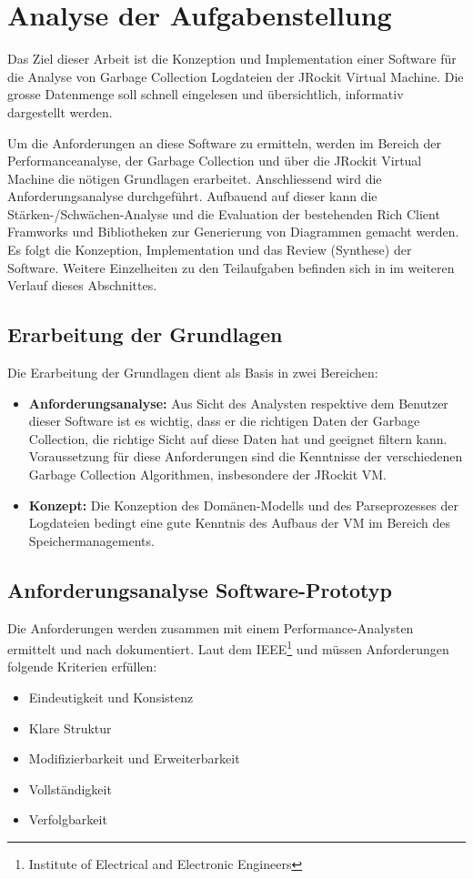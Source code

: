 \chapter{Analyse der Aufgabenstellung}\label{analyse_aufgabenstellung}
Das Ziel dieser Arbeit ist die Konzeption und Implementation einer Software für die Analyse von Garbage Collection Logdateien der JRockit Virtual Machine. Die grosse Datenmenge soll schnell eingelesen und übersichtlich, informativ dargestellt werden. 

Um die Anforderungen an diese Software zu ermitteln, werden im Bereich der Performanceanalyse, der Garbage Collection und über die JRockit Virtual Machine die nötigen Grundlagen erarbeitet. Anschliessend wird die Anforderungsanalyse durchgeführt. Aufbauend auf dieser kann die Stärken-/Schwächen-Analyse und die Evaluation der bestehenden Rich Client Framworks und Bibliotheken zur Generierung von Diagrammen gemacht werden. Es folgt die Konzeption, Implementation und das Review (Synthese) der Software. Weitere Einzelheiten zu den Teilaufgaben befinden sich in im weiteren Verlauf dieses Abschnittes.

\section{Erarbeitung der Grundlagen}
Die Erarbeitung der Grundlagen dient als Basis in zwei Bereichen:
\begin{itemize}
	\item \textbf{Anforderungsanalyse:} Aus Sicht des Analysten respektive dem Benutzer dieser Software ist es wichtig, dass er die richtigen Daten der Garbage Collection, die richtige Sicht auf diese Daten hat und geeignet filtern kann. Voraussetzung für diese Anforderungen sind die Kenntnisse der verschiedenen Garbage Collection Algorithmen, insbesondere der JRockit VM. 
	\item \textbf{Konzept: } Die Konzeption des Domänen-Modells und des Parseprozesses der Logdateien bedingt eine gute Kenntnis des Aufbaus der VM im Bereich des Speichermanagements.
\end{itemize}

\section{Anforderungsanalyse Software-Prototyp}
Die Anforderungen werden zusammen mit einem Performance-Analysten ermittelt und nach \cite[4.3.2 Angepasste Standardinhalte]{pohl2010basiswissen} dokumentiert. Laut dem IEEE\footnote{Institute of Electrical and Electronic Engineers} und \cite[4.5 Qualitätskriterien für das Anforderungsdokument]{pohl2010basiswissen} müssen Anforderungen folgende Kriterien erfüllen:
\begin{itemize}
	\item Eindeutigkeit und Konsistenz
	\item Klare Struktur
	\item Modifizierbarkeit und Erweiterbarkeit
	\item Vollständigkeit
	\item Verfolgbarkeit
\end{itemize}

